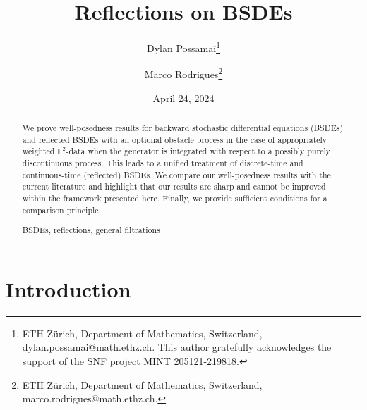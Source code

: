 \documentclass[10pt]{article} %
\newcommand{\1}{\mathbf{1}}
\begin{document}
\title{Reflections on BSDEs}


\author{Dylan {\sc Possama\"{i}}\footnote{ETH Z\"urich, Department of Mathematics, Switzerland, dylan.possamai@math.ethz.ch. This author gratefully acknowledges the support of the SNF project MINT 205121-219818.}\and Marco {\sc Rodrigues}\footnote{ETH Z\"urich, Department of Mathematics, Switzerland, marco.rodrigues@math.ethz.ch.}}

\date{April 24, 2024}

\maketitle

\begin{abstract}

We prove well-posedness results for backward stochastic differential equations (BSDEs) and reflected BSDEs with an optional obstacle process in the case of appropriately weighted $\mathbb{L}^2$-data when the generator is integrated with respect to a possibly purely discontinuous process. This leads to a unified treatment of discrete-time and continuous-time (reflected) BSDEs. We compare our well-posedness results with the current literature and highlight that our results are sharp and cannot be improved within the framework presented here. Finally, we provide sufficient conditions for a comparison principle.



\vspace{5mm}
  BSDEs, reflections, general filtrations\vspace{5mm}
\end{abstract}




	
\section{Introduction}\label{sec::introduction}
\end{document}
